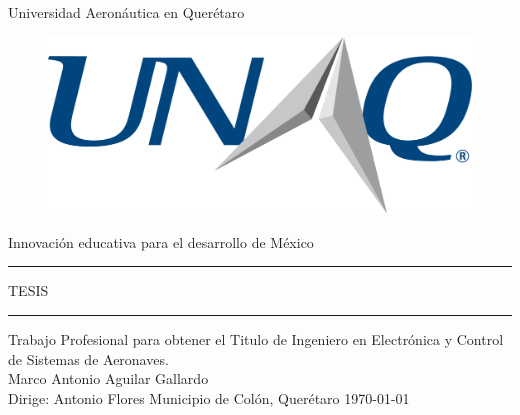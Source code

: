 \begin{titlepage}
	\begin{center}
		{\Huge Universidad Aeronáutica en Querétaro}
		\vspace{1cm}
		\begin{figure}[h]
			\centering
			\includegraphics[scale=0.5]{Portada/Logo.eps}
		\end{figure}
		\vspace{1cm}
		{\large Innovación educativa para el desarrollo de México}
		\vspace{0.5cm}
		\rule{150mm}{0.5mm}
		\vspace{2mm}
		{\huge TESIS}
		\vspace{2mm}
		\rule{150mm}{0.5mm}
		\vspace{1cm}
		\large Trabajo Profesional para obtener el Titulo de Ingeniero en Electrónica y Control de Sistemas de Aeronaves.
		\\
		\vspace{1cm}
		\Large Marco Antonio Aguilar Gallardo
		\\
		\vspace{1cm}
		\Large Dirige: Antonio Flores 
		\vfill
		\Large Municipio de Colón, Querétaro \hfill \today
		
		
	\end{center}


\clearpage

\end{titlepage}
